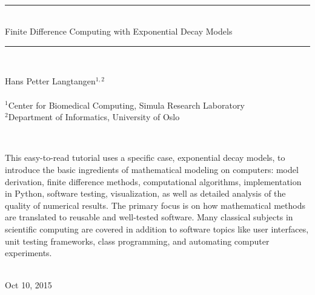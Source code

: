 \documentclass[graybox,sectrefs,envcountresetchap,open=right,final]{svmonodo}
\begin{document}





\frontmatter
\setcounter{page}{3}
\pagestyle{headings}



\thispagestyle{empty}
\hbox{\ \ }
\vfill
\begin{center}
{\huge{\bfseries{
\begin{spacing}{1.25}
{\rule{\linewidth}{0.5mm}} \\[0.4cm]
{Finite Difference Computing with Exponential Decay Models}
\\[0.4cm] {\rule{\linewidth}{0.5mm}} \\[1.5cm]
\end{spacing}
}}}


\vspace{0.5cm}

{\Large\textsf{Hans Petter Langtangen${}^{1, 2}$}}\\ [3mm]

\ \\ [2mm]

{\large\textsf{${}^1$Center for Biomedical Computing, Simula Research Laboratory} \\ [1.5mm]}
{\large\textsf{${}^2$Department of Informatics, University of Oslo} \\ [1.5mm]}

\ \\ [13mm]
\begin{center}
\begin{minipage}{0.9\linewidth}
\small
This easy-to-read tutorial uses a specific case, exponential decay
models, to introduce the basic ingredients of mathematical modeling on
computers: model derivation, finite difference methods, computational
algorithms, implementation in Python, software testing, visualization,
as well as detailed analysis of the quality of numerical results. The
primary focus is on how mathematical methods are translated to
reusable and well-tested software.  Many classical subjects in
scientific computing are covered in addition to software topics like
user interfaces, unit testing frameworks, class programming, and
automating computer experiments.
\end{minipage}
\end{center}

\ \\ [10mm]
{\large\textsf{Oct 10, 2015}}

\end{center}
\vfill
\clearpage
\end{document}
